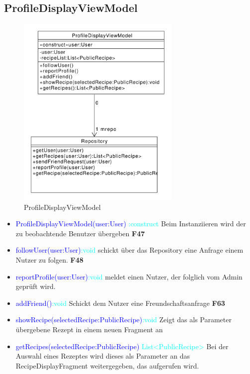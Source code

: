 \subsection{ProfileDisplayViewModel}
\begin{figure}[H]
	\centering
	\includegraphics[width=0.7\textwidth]{pics/viewModel/Profile_Display_ViewModel.pdf}%
	\caption{ProfileDisplayViewModel}%
	\label{viewModel}%
\end{figure}
\begin{itemize}
	\item \textcolor{blue}{ProfileDisplayViewModel(user:User)}
	\textcolor{cyan}{:construct} Beim Instanziieren wird der zu beobachtende Benutzer übergeben \textbf{F47}
	
	\item \textcolor{blue}{followUser(user:User)}\textcolor{cyan}{:void}
	schickt über das Repository eine Anfrage einem Nutzer zu folgen. \textbf{F48}
	\item \textcolor{blue}{reportProfile(user:User)}\textcolor{cyan}{:void}
	meldet einen Nutzer, der folglich vom Admin geprüft wird.
	\item \textcolor{blue}{addFriend()}\textcolor{cyan}{:void} Schickt dem Nutzer eine Freundschaftsanfrage \textbf{F63}
	\item \textcolor{blue}{showRecipe(selectedRecipe:PublicRecipe)}\textcolor{cyan}{:void} Zeigt das als Parameter übergebene Rezept in einem neuen Fragment an
	\item \textcolor{blue}{getRecipes(selectedRecipe:PublicRecipe)}
	\textcolor{cyan}{List<PublicRecipe>}
	Bei der Auswahl eines Rezeptes wird dieses als Parameter an das RecipeDisplayFragment weitergegeben, das aufgerufen wird.
\end{itemize}


